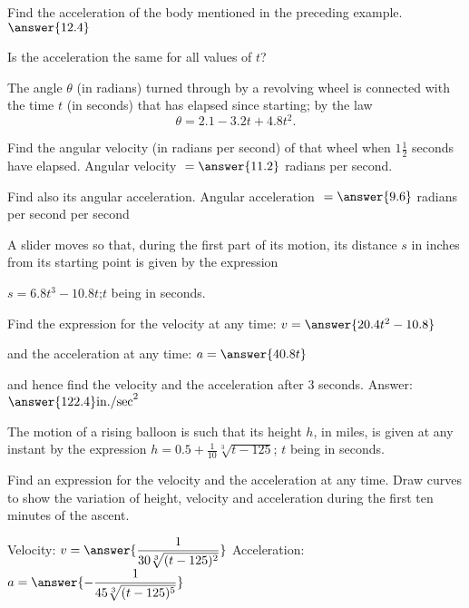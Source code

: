 \documentclass{ximera}
\begin{document}
\begin{problem}
Find the acceleration of the body mentioned in
the preceding example.
$\answer{12.4}$
\begin{question}
Is the acceleration the same for all values of $t$?
\begin{multipleChoice}
\end{multipleChoice}
\end{question}
\end{problem}

\begin{problem}
The angle $\theta$ (in radians) turned through by
a revolving wheel is connected with the time $t$ (in
seconds) that has elapsed since starting; by the law
\[
\theta = 2.1 - 3.2t + 4.8t^2.
\]

\begin{problem}
Find the angular velocity (in radians per second) of
that wheel when $1\frac{1}{2}$ seconds have elapsed.
Angular velocity ${} = \answer{11.2}$ radians per second.
\begin{problem}
Find also its angular acceleration.
Angular acceleration ${}=  \answer{9.6}$ radians per second per second
\end{problem}
\end{problem}


\begin{problem}
A slider moves so that, during the first part of
its motion, its distance $s$ in inches from its starting point is given by the expression

$s = 6.8t^3 - 10.8t$;{$t$ being in seconds}.


Find the expression for the velocity at any time: $v = \answer{20.4t^2 - 10.8}$
\end{problem}


\begin{problem}
and the acceleration at any time: $a = \answer{40.8t}$
\begin{problem}
and hence find the velocity and the acceleration after $3$ seconds. Answer: $\answer{122.4} \text{in./sec}^2$
\end{problem}
\end{problem}
\end{problem}

\begin{problem}
The motion of a rising balloon is such that its
height $h$, in miles, is given at any instant by the
expression $h = 0.5 + \frac{1}{10}\sqrt[3]{t-125}$; $t$ being in seconds.

Find an expression for the velocity and the acceleration at any time. Draw curves to show the variation of height, velocity and acceleration during the first ten minutes of the ascent.

Velocity: $v =  \answer{\dfrac{1}{30 \sqrt[3]{(t - 125)^2}}}$
Acceleration: $a = \answer{- \dfrac{1}{45 \sqrt[3]{(t - 125)^5}}}$

\end{problem}
\end{document}
